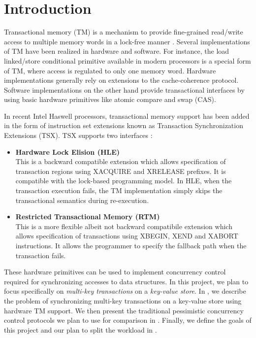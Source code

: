 \section{Introduction} \label{sec:intro}

Transactional memory (TM) is a mechanism to provide
fine-grained read/write access to multiple memory words in a lock-free manner
\citep{Herlihy93}. Several implementations of TM have been realized in hardware
and software. For instance, the load linked/store conditional primitive available
in modern processors is a special form of TM, where access is regulated to only
one memory word. Hardware implementations generally rely on extensions to the
cache-coherence protocol. Software implementations on the other hand provide
transactional interfaces by using basic hardware primitives like atomic compare and
swap (CAS).

In recent Intel Haswell processors, transactional memory support has been added
in the form of instruction set extensions known as Transaction Synchronization
Extensions (TSX). TSX supports two interfaces \citep{tsx-intro} : \\


\begin{itemize} 
\item \textbf{Hardware Lock Elision (HLE)} \\ This is a backward
compatible extension which allows specification of transaction regions using
\textrm{XACQUIRE} and \textrm{XRELEASE} prefixes. It is compatible with the lock-based programming
model. In HLE, when the transaction execution fails, the TM implementation
simply skips the transactional semantics during re-execution. \\ 

\item \textbf{Restricted Transactional Memory (RTM)} \\ This is a more
flexible albeit not backward compatibile extension which allows specification of
transactions using \textrm{XBEGIN, XEND and XABORT} instructions. It allows the
programmer to specify the fallback path when the transaction fails.  \\ 
\end{itemize}

These hardware primitives can be used to implement concurrency control 
required for synchronizing accesses to data structures. In this project,
we plan to focus specifically on \textit{multi-key transactions} on a
\textit{key-value store}. In ,
we describe the problem of synchronizing multi-key transactions on a 
key-value store using hardware TM support.
We then present the traditional pessimistic concurrency control protocols 
we plan to use for comparison in . Finally, we
define the goals of this project and our plan to split the workload
in .



